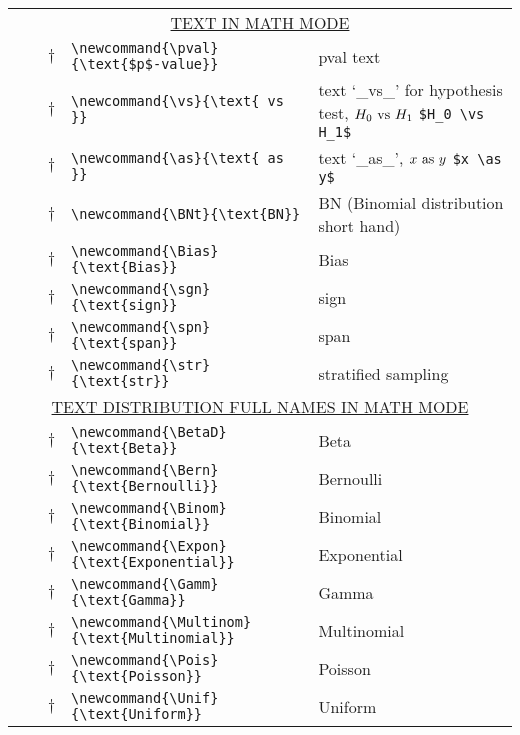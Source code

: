 \documentclass[11pt, letterpaper]{article}
\begin{document}
\begin{longtable}{p{.75in} p{.9in} p{.01in} p{3.55in}  p{1.45in} }
\multicolumn{5}{c}{\underline{TEXT IN MATH MODE}}
\\*  
\pval	 		&\code{\textbackslash pval}	&$\dagger$	& \lstinline|\newcommand{\pval}{\text{$p$-value}}| &
pval text
\\* 
\vs  		&\code{\textbackslash vs}	&$\dagger$			& \lstinline|\newcommand{\vs}{\text{ vs }}| &
text `\_vs\_' for hypothesis test,  
$H_0 \vs H_1$ \lstinline|$H_0 \vs H_1$ |
\\* 
\as  		&\code{\textbackslash as}	&$\dagger$			& \lstinline|\newcommand{\as}{\text{ as }}| &
text `\_as\_', 
$x \as y$ \lstinline|$x \as y$ |
\\*  
\BNt	 		&\code{\textbackslash BNt}	&$\dagger$	& \lstinline|\newcommand{\BNt}{\text{BN}}| &
BN (Binomial distribution short hand)
\\*  
\Bias	 		&\code{\textbackslash Bias}	&$\dagger$	& \lstinline|\newcommand{\Bias}{\text{Bias}}| &
Bias 
\\*  
\sgn	 		&\code{\textbackslash sgn}	&$\dagger$	& \lstinline|\newcommand{\sgn}{\text{sign}}| &
sign 
\\*  
\spn	 		&\code{\textbackslash spn}	&$\dagger$	& \lstinline|\newcommand{\spn}{\text{span}}| &
span 
\\*  
\str	 		&\code{\textbackslash str}	&$\dagger$	& \lstinline|\newcommand{\str}{\text{str}}| &
stratified sampling  
\\ \hline 


\multicolumn{5}{c}{\underline{TEXT DISTRIBUTION FULL NAMES IN MATH MODE}}
\\*  
\BetaD	 		&\code{\textbackslash BetaD}	&$\dagger$	& \lstinline|\newcommand{\BetaD}{\text{Beta}}| & Beta 
\\*  
\Bern	 		&\code{\textbackslash Bern}		&$\dagger$	& \lstinline|\newcommand{\Bern}{\text{Bernoulli}}| & Bernoulli
\\*  
\Binom	 		&\code{\textbackslash Binom}	&$\dagger$	& \lstinline|\newcommand{\Binom}{\text{Binomial}}| & Binomial
\\*  
\Expon	 		&\code{\textbackslash Expon}	&$\dagger$	& \lstinline|\newcommand{\Expon}{\text{Exponential}}| & Exponential
\\*  
\Gamm	 		&\code{\textbackslash Gamm}		&$\dagger$	& \lstinline|\newcommand{\Gamm}{\text{Gamma}}| & Gamma
\\*  
\Multinom 		&\code{\textbackslash Multinom}	&$\dagger$	& \lstinline|\newcommand{\Multinom}{\text{Multinomial}}| & Multinomial
\\*  
\Pois	 		&\code{\textbackslash Pois}		&$\dagger$	& \lstinline|\newcommand{\Pois}{\text{Poisson}}| & Poisson
\\*  
\Unif	 		&\code{\textbackslash Unif}		&$\dagger$	& \lstinline|\newcommand{\Unif}{\text{Uniform}}| & Uniform 
\\ \hline




\end{longtable}
\end{document}
